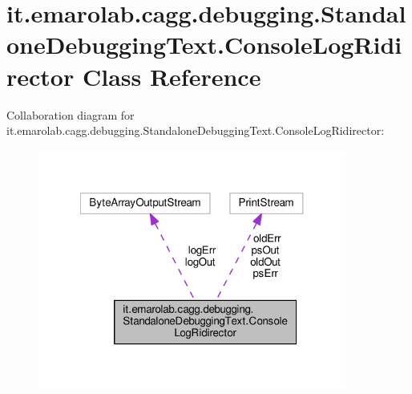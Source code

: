 \hypertarget{classit_1_1emarolab_1_1cagg_1_1debugging_1_1StandaloneDebuggingText_1_1ConsoleLogRidirector}{\section{it.\-emarolab.\-cagg.\-debugging.\-Standalone\-Debugging\-Text.\-Console\-Log\-Ridirector Class Reference}
\label{classit_1_1emarolab_1_1cagg_1_1debugging_1_1StandaloneDebuggingText_1_1ConsoleLogRidirector}
}


Collaboration diagram for it.\-emarolab.\-cagg.\-debugging.\-Standalone\-Debugging\-Text.\-Console\-Log\-Ridirector\-:\nopagebreak
\begin{figure}[H]
\begin{center}
\leavevmode
\includegraphics[width=287pt]{classit_1_1emarolab_1_1cagg_1_1debugging_1_1StandaloneDebuggingText_1_1ConsoleLogRidirector__coll__graph}
\end{center}
\end{figure}
